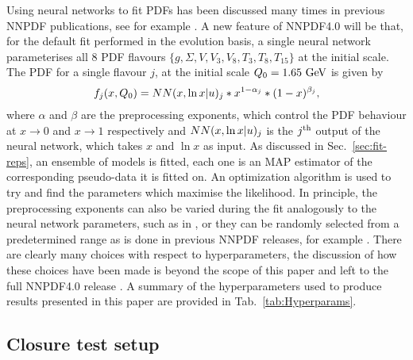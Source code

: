 Using neural networks to fit PDFs has been discussed many times in previous
NNPDF publications, see for example \cite{nnpdf30, Ball_2017}. A new feature of
NNPDF4.0 will be that, for the default fit performed in the evolution basis, a
single neural network parameterises all 8 PDF flavours $\{ g, \Sigma, V, V_3,
V_8, T_3, T_8, T_{15} \}$ at the initial scale. The PDF for a single flavour $j$,
at the initial scale $Q_0 = 1.65~{\rm GeV}$ is given by
\begin{equation}
    f_j(x, Q_0) = NN(x, \ln x | u)_j * x^{1-\alpha_j} * (1-x)^{\beta_j},
\end{equation}
where $\alpha$ and $\beta$ are the preprocessing exponents, which control the
PDF behaviour at $x \to 0$ and $x \to 1$ respectively and $NN(x, \ln x |
u)_j$ is the $j^{\rm th}$ output of the neural network, which takes $x$
and $\ln x$ as input. As discussed in Sec.~\ref{sec:fit-reps}, an ensemble of
models is fitted, each one is an MAP estimator of the corresponding pseudo-data
it is fitted on. 
An optimization algorithm is used to try and find the parameters which maximise the likelihood.
In principle, the preprocessing exponents can also be varied during the fit
analogously to the neural network parameters, such as in \cite{Carrazza_2019},
or they can be randomly selected from a predetermined range as is done in
previous NNPDF releases, for example \cite{Ball_2017}. There are clearly many
choices with respect to hyperparameters, the discussion of how these choices
have been made is beyond the scope of this paper and left to the full NNPDF4.0
release \cite{NNPDF40}. A summary of the hyperparameters used to produce results
presented in this paper are provided in Tab.~\ref{tab:Hyperparams}.



\subsection{Closure test setup}

